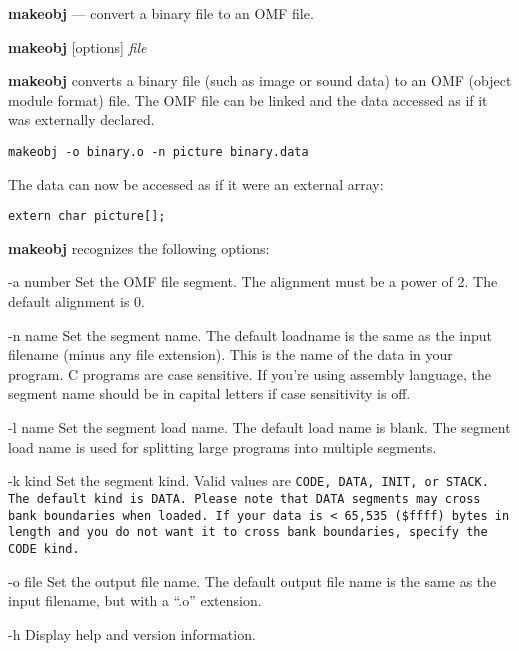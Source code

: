 \documentclass{article}
\def\makeobj{\textbf{makeobj} }
\begin{document}
\makeobj --- convert a binary file to an OMF file.


\makeobj [options] \textit{file}


\makeobj converts a binary file (such as image or sound data) to an OMF (object module format) file.  The OMF file can be linked and the data accessed as if it was externally declared.


\begin{verbatim}
makeobj -o binary.o -n picture binary.data
\end{verbatim}

The data can now be accessed as if it were an external array:

\begin{verbatim}
extern char picture[];
\end{verbatim}



\makeobj recognizes the following options:
\begin{optionlist}
	\item [-a number] Set the OMF file segment.  The alignment must be a power of 2.  The 
	default alignment is 0.
	\item [-n name]
	Set the segment name. The default loadname is the same as the input filename 
	(minus any file extension). This is the name of the data in your program. C programs
	are case sensitive. If you're using assembly language, the segment name should be
	in capital letters if case sensitivity is off. 
	\item [-l name]
	Set the segment load name.  The default load name is blank.  The segment load name is used
	for splitting large programs into multiple segments. 
	\item [-k kind]
	Set the segment kind.  Valid values are \tt{CODE}, \tt{DATA}, \tt{INIT}, or \tt{STACK}.  
	The default kind is \tt{DATA}.  Please note that \tt{DATA} segments may cross bank 
	boundaries when
	loaded.  If your data is < 65,535 (\tt{\$ffff}) bytes in length and you do not want it to cross
	bank boundaries, specify the \tt{CODE} kind. 
	\item [-o file]
	Set the output file name.  The default output file name is the same as the input filename, 
	but with a ``.o'' extension.
	\item [-h]
	Display help and version information.
	
\end{optionlist}
\end{document}
